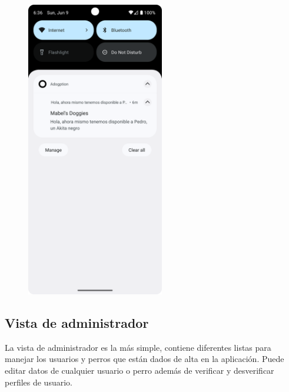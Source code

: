 \documentclass[a4paper, 12pt]{article}
\begin{document}
\begin{figure}[H]
	\begin{center}
		{\includegraphics[width=6cm]{app/Notifications.png}\par}
	\end{center}  
\end{figure}


\newpage
\subsection*{Vista de administrador}

La vista de administrador es la más simple, contiene diferentes listas para manejar los usuarios y perros que están dados de alta en la aplicación. Puede editar datos de cualquier usuario o perro además de verificar y desverificar perfiles de usuario.
\end{document}
